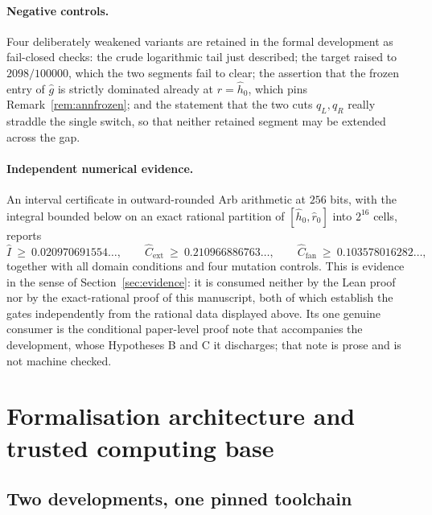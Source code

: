\documentclass[11pt]{article}
\theoremstyle{plain}
\theoremstyle{definition}
\theoremstyle{remark}
\begin{document}
\paragraph{Negative controls.} Four deliberately weakened variants are retained
in the formal development as fail-closed checks: the crude logarithmic tail just
described; the target raised to $2098/100000$, which the two segments fail to
clear; the assertion that the frozen entry of $\hat g$ is strictly dominated
already at $r=\hat h_{0}$, which pins Remark~\ref{rem:annfrozen}; and the
statement that the two cuts $q_{L},q_{R}$ really straddle the single switch, so
that neither retained segment may be extended across the gap.

\paragraph{Independent numerical evidence.} An interval certificate in
outward-rounded Arb arithmetic at $256$ bits, with the integral bounded below on
an exact rational partition of $[\hat h_{0},\hat r_{0}]$ into $2^{16}$ cells,
reports
\[
  \hat I\ \ge\ 0.020970691554\ldots,
  \qquad
  \hat C_{\mathrm{ext}}\ \ge\ 0.210966886763\ldots,
  \qquad
  \hat C_{\mathrm{fan}}\ \ge\ 0.103578016282\ldots,
\]
together with all domain conditions and four mutation controls. This is
evidence in the sense of Section~\ref{sec:evidence}: it is consumed neither by
the Lean proof nor by the exact-rational proof of this manuscript, both of which
establish the gates independently from the rational data displayed above. Its
one genuine consumer is the conditional paper-level proof note that accompanies
the development, whose Hypotheses B and C it discharges; that note is prose and
is not machine checked.

\section{Formalisation architecture and trusted computing base}
\label{app:formalization}

\subsection{Two developments, one pinned toolchain}
\end{document}
